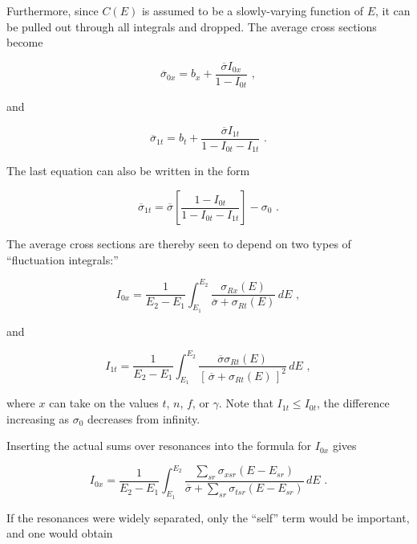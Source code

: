 \noindent
Furthermore, since $C(E)$ is assumed to be a slowly-varying function
of $E$, it can be pulled out through all integrals and dropped.
The average cross sections become

\begin{equation}
  \overline{\sigma}_{0x}=b_x+\frac{\overline{\sigma}I_{0x}}
          {1-I_{0t}}\,\,,
\end{equation}

\noindent
and

\begin{equation}
   \overline{\sigma}_{1t}=b_t+\frac{\overline{\sigma}I_{1t}}
          {1-I_{0t}-I_{1t}} \,\,.
\end{equation}

\noindent
The last equation can also be written in the form

\begin{equation}
   \overline{\sigma}_{1t} = \overline{\sigma}\left[
     \frac{1-I_{0t}}{1-I_{0t}-I_{1t}}\right]-\sigma_0\,\,.
\end{equation}

\noindent
The average cross sections are thereby seen to depend on two types of
``fluctuation integrals:''

\begin{equation}
   I_{0x}=\frac{1}{E_2-E_1}
     \int_{E_1}^{E_2}\frac{\sigma_{Rx}(E)}
       {\overline{\sigma}+\sigma_{Rt}(E)}\,dE\,\,,
\end{equation}

\noindent
and

\begin{equation}
   I_{1t}=\frac{1}{E_2-E_1}
     \int_{E_1}^{E_2}\frac{\overline{\sigma}\sigma_{Rt}(E)}
       {[\,\overline{\sigma}+\sigma_{Rt}(E)\,]^2}\,dE\,\,,
\end{equation}

\noindent
where $x$ can take on the values $t$, $n$, $f$, or $\gamma$.  Note
that $I_{1t}{\leq}I_{0t}$, the difference increasing as $\sigma_0$
decreases from infinity.

Inserting the actual sums over resonances into the formula
for $I_{0x}$ gives

\begin{equation}
   I_{0x}=\frac{1}{E_2-E_1}
     \int_{E_1}^{E_2}\frac{\sum_{sr}\sigma_{xsr}(E-E_{sr})}
       {\overline{\sigma}+\sum_{sr}\sigma_{tsr}(E-E_{sr})}\,dE\,\,.
\end{equation}

\noindent
If the resonances were widely separated, only the ``self'' term
would be important, and one would obtain

